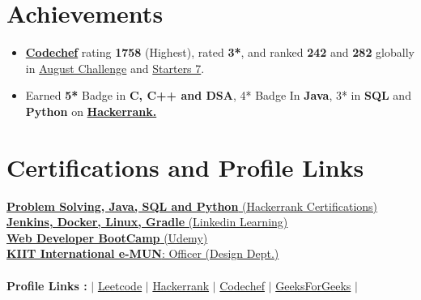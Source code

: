 \documentclass[letterpaper,11pt]{article}
\newcommand{\resumeItem}[2]{
  \item\small{
    \textbf{#1}{ #2 \vspace{-2pt}}
  }
}
\newcommand{\resumeSubHeadingListStart}{\begin{itemize}[leftmargin=*]}
\newcommand{\resumeSubHeadingListEnd}{\end{itemize}}
\newcommand{\resumeItemListStart}{\begin{itemize}}
\newcommand{\resumeItemListEnd}{\end{itemize}\vspace{-5pt}}
\begin{document}
\section{Achievements}
 \resumeSubHeadingListStart
    	\resumeItem{}{\href{https://codechef.com/users/ramnit_code_27}{\bf Codechef} rating \textbf{1758} (Highest), rated \textbf{3*}, and ranked \textbf{242} and \textbf{282} globally in \href{https://www.codechef.com/AUG21C}{August Challenge} and \href{https://www.codechef.com/START7C}{Starters 7}.}
    	
    	\resumeItem{}{Earned \textbf{5*} Badge in \textbf{C, C++ and DSA}, 4* Badge In \textbf{Java}, 3* in \textbf{SQL} and \textbf{Python} on  {\href{https://www.hackerrank.com/satyajeetramnit1?hr_r=1}{\bf Hackerrank.}}}
 \resumeSubHeadingListEnd
 

\section{Certifications and Profile Links}
 \begin{itemize}[leftmargin=0.15in, label={}]
	\small{\item{
		\href{https://www.hackerrank.com/certificates/a64619ef6646}{\textbf{Problem Solving, Java, SQL and Python} (Hackerrank Certifications)} \\
 	    \href{https://www.linkedin.com/learning/certificates/437d80a079b3258b9a7ad1454288114968617d0b9e8b041a2d8a7fd1eca0fc57}{\textbf{Jenkins, Docker, Linux, Gradle} (Linkedin Learning)} \\
      \href{https://www.udemy.com/certificate/UC-1adcc95f-c44b-49e7-8a39-75b9e84a3350/}{\textbf{Web Developer BootCamp} (Udemy)} \\
 	    \href{https://drive.google.com/file/d/1gAJfSQNtBdIQe9vkkxHTb0J2uGw_tLmb/view}{\textbf{KIIT International e-MUN}{: Officer (Design Dept.)}} \\
 	    \  \ \\
 	    \textbf{Profile Links :}{ $|$ \href{https://leetcode.com/satyajeetramnit2708/}{{Leetcode}} $|$ \href{https://www.hackerrank.com/satyajeetramnit1?hr_r=1}{{Hackerrank}} $|$ \href{https://www.codechef.com/users/ramnit_code_27}{{Codechef}} $|$ \href{https://auth.geeksforgeeks.org/user/satyajeetramnit27/practice/}{{GeeksForGeeks}} $|$} \\
	}}
 \end{itemize}
 \vspace{-16pt}
\end{document}
